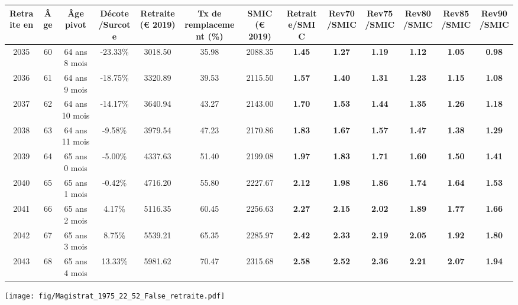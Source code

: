 { \scriptsize \begin{center} 
\begin{tabular}[htb]{|c|c||c|c||c|c||c||c|c|c|c|c|c|} 
\hline 
 Retraite en &  Âge &  Âge pivot &  Décote/Surcote &  Retraite (\euro{} 2019) &  Tx de remplacement (\%) &  SMIC (\euro{} 2019) &  Retraite/SMIC &  Rev70/SMIC &  Rev75/SMIC &  Rev80/SMIC &  Rev85/SMIC &  Rev90/SMIC \\ 
\hline \hline 
 2035 &  60 &  64 ans 8 mois &  -23.33\% &  3018.50 &  35.98 &  2088.35 &  {\bf 1.45} &  {\bf 1.27} &  {\bf 1.19} &  {\bf 1.12} &  {\bf 1.05} &  {\bf {\color{red} 0.98}} \\ 
\hline 
 2036 &  61 &  64 ans 9 mois &  -18.75\% &  3320.89 &  39.53 &  2115.50 &  {\bf 1.57} &  {\bf 1.40} &  {\bf 1.31} &  {\bf 1.23} &  {\bf 1.15} &  {\bf 1.08} \\ 
\hline 
 2037 &  62 &  64 ans 10 mois &  -14.17\% &  3640.94 &  43.27 &  2143.00 &  {\bf 1.70} &  {\bf 1.53} &  {\bf 1.44} &  {\bf 1.35} &  {\bf 1.26} &  {\bf 1.18} \\ 
\hline 
 2038 &  63 &  64 ans 11 mois &  -9.58\% &  3979.54 &  47.23 &  2170.86 &  {\bf 1.83} &  {\bf 1.67} &  {\bf 1.57} &  {\bf 1.47} &  {\bf 1.38} &  {\bf 1.29} \\ 
\hline 
 2039 &  64 &  65 ans 0 mois &  -5.00\% &  4337.63 &  51.40 &  2199.08 &  {\bf 1.97} &  {\bf 1.83} &  {\bf 1.71} &  {\bf 1.60} &  {\bf 1.50} &  {\bf 1.41} \\ 
\hline 
 2040 &  65 &  65 ans 1 mois &  -0.42\% &  4716.20 &  55.80 &  2227.67 &  {\bf 2.12} &  {\bf 1.98} &  {\bf 1.86} &  {\bf 1.74} &  {\bf 1.64} &  {\bf 1.53} \\ 
\hline 
 2041 &  66 &  65 ans 2 mois &  4.17\% &  5116.35 &  60.45 &  2256.63 &  {\bf 2.27} &  {\bf 2.15} &  {\bf 2.02} &  {\bf 1.89} &  {\bf 1.77} &  {\bf 1.66} \\ 
\hline 
 2042 &  67 &  65 ans 3 mois &  8.75\% &  5539.21 &  65.35 &  2285.97 &  {\bf 2.42} &  {\bf 2.33} &  {\bf 2.19} &  {\bf 2.05} &  {\bf 1.92} &  {\bf 1.80} \\ 
\hline 
 2043 &  68 &  65 ans 4 mois &  13.33\% &  5981.62 &  70.47 &  2315.68 &  {\bf 2.58} &  {\bf 2.52} &  {\bf 2.36} &  {\bf 2.21} &  {\bf 2.07} &  {\bf 1.94} \\ 
\hline 
\hline 
\end{tabular} 
\end{center} } 

 \begin{center}\texttt{[image: fig/Magistrat\_1975\_22\_52\_False\_retraite.pdf]}\end{center} 

